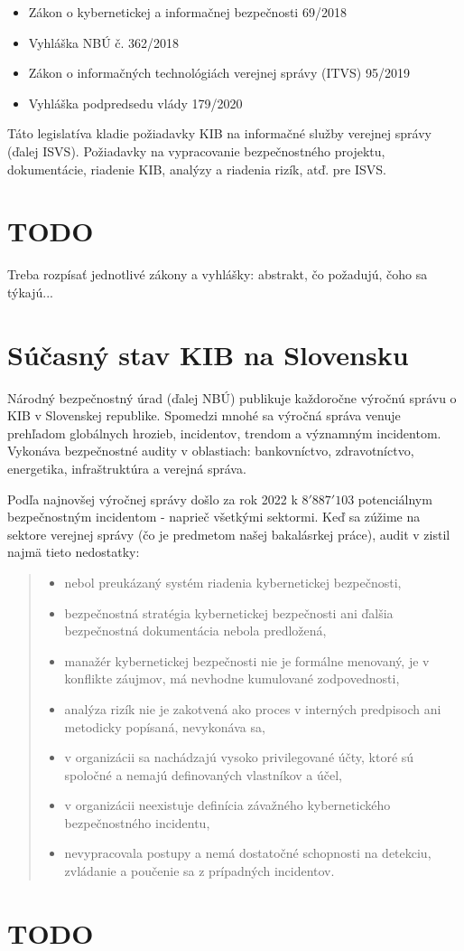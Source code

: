 \begin{itemize}
  \item Zákon o kybernetickej a informačnej bezpečnosti 69/2018
  \item Vyhláška NBÚ č. 362/2018
  \item Zákon o informačných technológiách verejnej správy (ITVS) 95/2019
  \item Vyhláška podpredsedu vlády 179/2020
\end{itemize}

Táto legislatíva kladie požiadavky KIB na informačné služby verejnej správy (ďalej ISVS). Požiadavky na 
vypracovanie bezpečnostného projektu, dokumentácie, riadenie KIB, analýzy a riadenia rizík, atď. pre ISVS. 

\section*{TODO} 
Treba rozpísať jednotlivé zákony a vyhlášky: abstrakt, čo požadujú, čoho sa týkajú...

  \section{Súčasný stav KIB na Slovensku}
Národný bezpečnostný úrad (ďalej NBÚ) publikuje každoročne výročnú správu o KIB v Slovenskej republike. Spomedzi mnohé 
sa výročná správa venuje prehľadom globálnych hrozieb, incidentov, trendom a významným incidentom. Vykonáva bezpečnostné
audity v oblastiach: bankovníctvo, zdravotníctvo, energetika, infraštruktúra a verejná správa.

Podľa najnovšej výročnej správy \cite{KIBSK22} došlo za rok 2022 k $8'887'103$ potenciálnym bezpečnostným incidentom - naprieč všetkými sektormi. Keď sa zúžime na sektore verejnej správy (čo je predmetom našej bakalásrkej práce), audit v zistil
najmä tieto nedostatky: 

\begin{quote}
  \begin{itemize}
    \item nebol preukázaný systém riadenia kybernetickej bezpečnosti,
    \item bezpečnostná stratégia kybernetickej bezpečnosti ani ďalšia bezpečnostná dokumentácia nebola predložená,
    \item manažér kybernetickej bezpečnosti nie je formálne menovaný, je v konflikte záujmov, má nevhodne kumulované zodpovednosti,
    \item analýza rizík nie je zakotvená ako proces v interných predpisoch ani metodicky popísaná, nevykonáva sa,
    \item v organizácii sa nachádzajú vysoko privilegované účty, ktoré sú spoločné a nemajú definovaných vlastníkov a účel,
    \item v organizácii neexistuje definícia závažného kybernetického bezpečnostného incidentu,
    \item nevypracovala postupy a nemá dostatočné schopnosti na detekciu, zvládanie a poučenie sa z prípadných incidentov.
  \end{itemize}
\end{quote}

\section*{TODO} 
